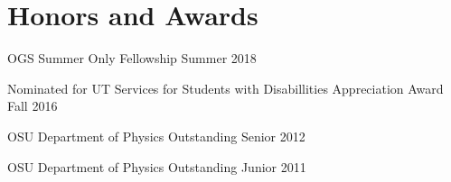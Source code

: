 \documentclass[letterpaper]{article}
\renewenvironment{itemize}{
  \begin{list}{}{
    \setlength{\leftmargin}{1.5em}
  }
}{
  \end{list}
}
\begin{document}
\section*{Honors and Awards}
\begin{itemize} \itemsep1pt \parskip0pt 

\item OGS Summer Only Fellowship \hfill{Summer 2018}

\item Nominated for UT Services for Students with Disabillities Appreciation Award \hfill{Fall 2016}

\item OSU Department of Physics Outstanding Senior \hfill{2012}

\item OSU Department of Physics Outstanding Junior \hfill{2011}
\end{itemize}
\end{document}

